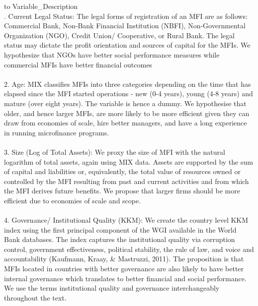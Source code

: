 \documentclass[a4paper, nobind]{templates/ociamthesis}
\begin{document}
\begin{table}
\caption{\label{tab:unnamed-chunk-110}Description of Independent Variables}
\centering
\fontsize{9}{11}\selectfont
\begin{tabu} to 
\toprule
Variable\_Description\\
. Current Legal Status: The legal forms of registration of an MFI are as follows: Commercial Bank, Non-Bank Financial Institution (NBFI), Non-Governmental Organization (NGO), Credit Union/ Cooperative, or Rural Bank. The legal status may dictate the profit orientation and sources of capital for the MFIs. We hypothesize that NGOs have better social performance measures while commercial MFIs have better financial outcomes\\
\\
2.  Age: MIX classifies MFIs into three categories depending on the time that has elapsed since the MFI started operations - new (0-4 years), young (4-8 years) and mature (over eight years). The variable is hence a dummy. We hypothesise that older, and hence larger MFIs, are more likely to be more efficient given they can draw from economies of scale, hire better managers, and have a long experience in running microfinance programs.\\
\\
3. Size (Log of Total Assets): We proxy the size of MFI with the natural logarithm of total assets, again using MIX data. Assets are supported by the sum of capital and liabilities or, equivalently, the total value of resources owned or controlled by the MFI resulting from past and current activities and from which the MFI derives future benefits. We propose that larger firms should be more efficient due to economies of scale and scope.\\
\addlinespace
\\
4. Governance/ Institutional Quality (KKM): We create the country level KKM index using the first principal component of the WGI available in the World Bank databases. The index captures the institutional quality via corruption control, government effectiveness, political stability, the rule of law, and voice and accountability (Kaufmann, Kraay, \& Mastruzzi, 2011). The proposition is that MFIs located in countries with better governance are also likely to have better internal governance which translates to better financial and social performance. We use the terms institutional quality and governance interchangeably throughout the text.\\
\\

\end{tabu}
\end{table}
\end{document}
